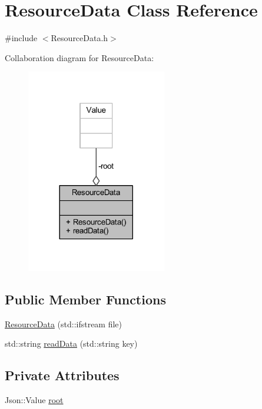 \hypertarget{class_resource_data}{}\section{Resource\+Data Class Reference}
\label{class_resource_data}


{\ttfamily \#include $<$Resource\+Data.\+h$>$}



Collaboration diagram for Resource\+Data\+:\nopagebreak
\begin{figure}[H]
\begin{center}
\leavevmode
\includegraphics[width=173pt]{class_resource_data__coll__graph}
\end{center}
\end{figure}
\subsection*{Public Member Functions}
\begin{DoxyCompactItemize}
\item 
\hyperlink{class_resource_data_afa0fffd6caad715b697c1b3a388c975d}{Resource\+Data} (std\+::ifstream file)
\item 
std\+::string \hyperlink{class_resource_data_a2e18ba115b2598590c15a16240542948}{read\+Data} (std\+::string key)
\end{DoxyCompactItemize}
\subsection*{Private Attributes}
\begin{DoxyCompactItemize}
\item 
Json\+::\+Value \hyperlink{class_resource_data_a0e9ea464b4a3fae26f68d01e344008fb}{root}
\end{DoxyCompactItemize}


